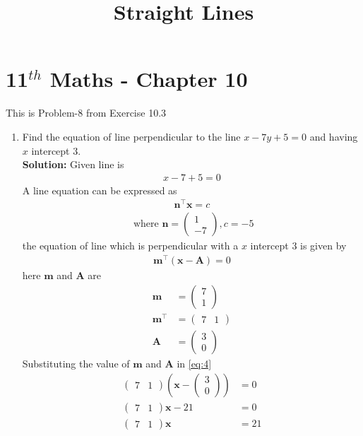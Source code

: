 \documentclass[12pt]{article}
\providecommand{\brak}[1]{\ensuremath{\left(#1\right)}}
\newcommand{\solution}{\noindent \textbf{Solution: }}
\newcommand{\myvec}[1]{\ensuremath{\begin{pmatrix}#1\end{pmatrix}}}
\let\vec\mathbf
\begin{document}
\begin{center}
\title{\textbf{Straight Lines}}
\date{\vspace{-5ex}} %
\maketitle
\end{center}
\setcounter{page}{1}
\section*{11$^{th}$ Maths - Chapter 10}
This is Problem-8 from Exercise 10.3
\begin{enumerate}
	\item Find the equation of line perpendicular to the line $x-7y+5=0$ and having $x$ intercept $3$.\\
\solution
Given line is 
\begin{align}
	x-7+5=0
\end{align}
A line equation can be expressed as 
\begin{align}
	\vec{n}^{\top}\vec{x}=c
\end{align}
\begin{align}
	\text{ where }
		\vec{n} = \myvec{1\\-7} , c = -5
\end{align}
the equation of line which is perpendicular with a  $x$ intercept $3$ is given by 
\begin{align}
	\vec{m}^\top\brak{\vec{x}-\vec{A}}=0 \label{eq:4}
\end{align}
		here $\vec{m}$ and $\vec{A}$ are 
\begin{align}
	\vec{m} &=\myvec{7\\1}\\
	\vec{m}^\top &=\myvec{7 & 1}\\
	\vec{A} &=\myvec{3\\0}
\end{align}
		Substituting the value of $\vec{m}$ and $\vec{A}$ in \eqref{eq:4}
		\begin{align}
			\myvec{7 & 1}\brak{\vec{x}-\myvec{3\\0}} &=0\\
			\myvec{7 & 1}\vec{x}-21 &=0\\
			\myvec{7 & 1}\vec{x} &= 21
		\end{align}
\begin{figure}[!h]
\begin{center}

\end{center}
\end{figure}
\end{enumerate}
\end{document}
